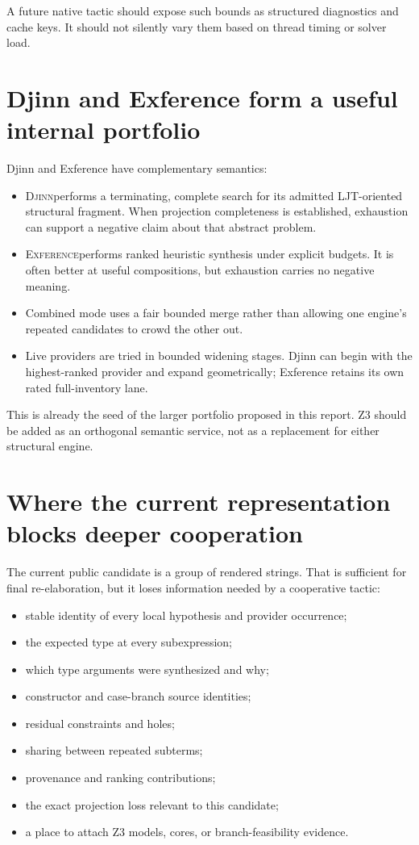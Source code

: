 \documentclass[11pt,letterpaper,openany]{report}
\newcommand{\Djinn}{\textsc{Djinn}}
\newcommand{\Exference}{\textsc{Exference}}
\begin{document}
A future native tactic should expose such bounds as structured diagnostics and cache
keys. It should not silently vary them based on thread timing or solver load.

\section{Djinn and Exference form a useful internal portfolio}

Djinn and Exference have complementary semantics:

\begin{itemize}
  \item \Djinn performs a terminating, complete search for its admitted LJT-oriented
        structural fragment. When projection completeness is established, exhaustion
        can support a negative claim about that abstract problem.
  \item \Exference performs ranked heuristic synthesis under explicit budgets. It is
        often better at useful compositions, but exhaustion carries no negative
        meaning.
  \item Combined mode uses a fair bounded merge rather than allowing one engine's
        repeated candidates to crowd the other out.
  \item Live providers are tried in bounded widening stages. Djinn can begin with the
        highest-ranked provider and expand geometrically; Exference retains its own
        rated full-inventory lane.
\end{itemize}

This is already the seed of the larger portfolio proposed in this report. Z3 should be
added as an orthogonal semantic service, not as a replacement for either structural
engine.

\section{Where the current representation blocks deeper cooperation}

The current public candidate is a group of rendered strings. That is sufficient for
final re-elaboration, but it loses information needed by a cooperative tactic:

\begin{itemize}
  \item stable identity of every local hypothesis and provider occurrence;
  \item the expected type at every subexpression;
  \item which type arguments were synthesized and why;
  \item constructor and case-branch source identities;
  \item residual constraints and holes;
  \item sharing between repeated subterms;
  \item provenance and ranking contributions;
  \item the exact projection loss relevant to this candidate;
  \item a place to attach Z3 models, cores, or branch-feasibility evidence.
\end{itemize}
\end{document}
